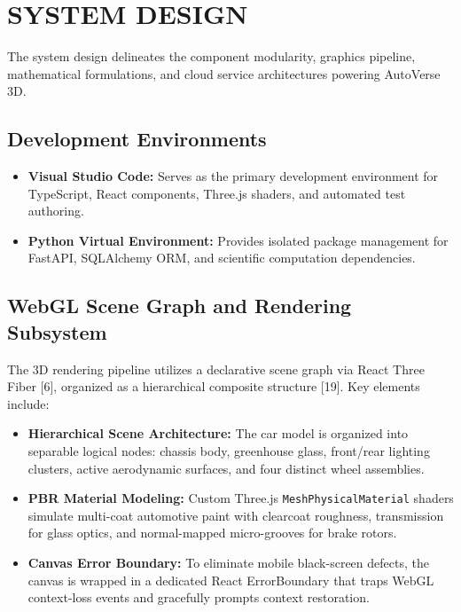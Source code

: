 \documentclass[12pt,a4paper]{report}
\begin{document}
\chapter{SYSTEM DESIGN}

The system design delineates the component modularity, graphics pipeline, mathematical formulations, and cloud service architectures powering AutoVerse 3D.

\section{Development Environments}
\begin{itemize}
    \item \textbf{Visual Studio Code:} Serves as the primary development environment for TypeScript, React components, Three.js shaders, and automated test authoring.
    \item \textbf{Python Virtual Environment:} Provides isolated package management for FastAPI, SQLAlchemy ORM, and scientific computation dependencies.
\end{itemize}

\section{WebGL Scene Graph and Rendering Subsystem}
The 3D rendering pipeline utilizes a declarative scene graph via React Three Fiber [6], organized as a hierarchical composite structure [19]. Key elements include:
\begin{itemize}
    \item \textbf{Hierarchical Scene Architecture:} The car model is organized into separable logical nodes: chassis body, greenhouse glass, front/rear lighting clusters, active aerodynamic surfaces, and four distinct wheel assemblies.
    \item \textbf{PBR Material Modeling:} Custom Three.js \texttt{MeshPhysicalMaterial} shaders simulate multi-coat automotive paint with clearcoat roughness, transmission for glass optics, and normal-mapped micro-grooves for brake rotors.
    \item \textbf{Canvas Error Boundary:} To eliminate mobile black-screen defects, the canvas is wrapped in a dedicated React ErrorBoundary that traps WebGL context-loss events and gracefully prompts context restoration.
\end{itemize}
\end{document}
